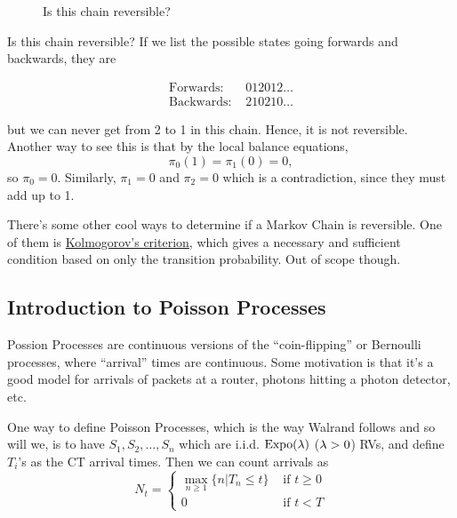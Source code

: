 \documentclass[11 pt]{scrartcl}
\begin{document}
\begin{figure}[!ht]
\begin{center}
\end{center}
\caption{Is this chain reversible?}
\end{figure}

Is this chain reversible? If we list the possible states going forwards and backwards, they are  

\begin{align*}
    \text{Forwards: } & 012012\dots \\ 
    \text{Backwards: } & 210210\dots 
\end{align*}

but we can never get from 2 to 1 in this chain. Hence, it is not reversible. Another way to see this is that by the local balance equations, 
\[ \pi_0(1) = \pi_1(0) = 0,\] 
so $\pi_0 = 0$. Similarly, $\pi_1 = 0$ and $\pi_2 = 0$ which is a contradiction, since they must add up to 1. 

There's some other cool ways to determine if a Markov Chain is reversible. One of them is \href{https://en.wikipedia.org/wiki/Kolmogorov%27s_criterion}{Kolmogorov's criterion}, which gives a necessary and sufficient condition based on only the transition probability. Out of scope though. 

\subsection{Introduction to Poisson Processes}
Possion Processes are continuous versions of the ``coin-flipping'' or Bernoulli processes, where ``arrival'' times are continuous. Some motivation is that it's a good model for arrivals of packets at a router, photons hitting a photon detector, etc. 

One way to define Poisson Processes, which is the way Walrand follows and so will we, is to have $S_1, S_2, \dots, S_n$ which are i.i.d. $\text{Expo}(\lambda)$ ($\lambda >0$) RVs, and define $T_i$'s as the CT arrival times. Then we can count arrivals as 
\[ N_t = \begin{cases} 
        \max_{n\geq 1} \{ n | T_n \leq t \} &\text{ if }t\geq 0 \\ 
        0 &\text{ if } t < T 
    \end{cases} 
\] 
\end{document}
